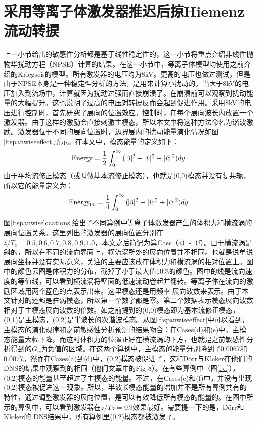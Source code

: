 \section{采用等离子体激发器推迟后掠Hiemenz流动转捩}
上一小节给出的敏感性分析都是基于线性稳定性的，这一小节将重点介绍非线性抛物华扰动方程（NPSE）计算的结果。在这一小节中，等离子体模型均使用之前介绍的Kriegseis的模型\cite{kriegseis2013velocity}。所有激发器的电压均为8kV。更高的电压也做过测试，但是由于NPSE本身是一种稳定性分析的方法，是用来计算小扰动的。当大于8kV的电压加入到流场中，计算就因为扰动过强而直接崩溃了。在崩溃前可以观察到扰动能量的大幅提升。这也说明了过高的电压对转捩反而会起到促进作用。采用8kV的电压进行控制时，首先研究了展向的位置效应。控制时，在每个展向波长内放置一个激发器。由于这样的激励会直接刺激主模态，所以本文中将这种方法命名为谐波激励。激发器位于不同的展向位置时，边界层内的扰动能量演化情况如图\ref{f:spanwiseeffect}所示。在本文中，模态能量的定义如下：
\begin{equation}
{\rm Energy}=\frac{1}{2}\int_{0}^{\infty}{(|\hat u|^2+|\hat v|^2+|\hat w|^2)dy}
\end{equation}
由于平均流修正模态（或叫做基本流修正模态），也就是(0,0)模态并没有复共轭，所以它的能量定义为：
\begin{equation}
{\rm Energy}_{00}=\frac{1}{4}\int_{0}^{\infty}{(|\hat u|^2+|\hat v|^2+|\hat w|^2)dy}
\end{equation}

图\ref{f:spanwiselocations}给出了不同算例中等离子体激发器产生的体积力和横流涡的展向位置关系。这里列出的激发器的展向位置分别在$z/T_z = 0.5, 0.6, 0.7, 0.8, 0.9, 1.0$，本文之后简记为算Case（a）-（f）。由于横流涡是斜的，所以在不同的流向界面上，横流涡所处的展向位置并不相同。也就是说单说展向坐标并没有实际意义，关注的主要应该放在体积力和横流涡的相对位置上。图中的颜色云图是体积力的分布，截掉了小于最大值10\%的颜色。图中的线是流向速度的等值线，可以看到横流涡将壁面的低速流动卷起并翻转。等离子体在流向的激励区域用两个蓝色的点表示出来。这里模态还是用频率-展向波数来表示。由于本文针对的还都是驻涡模态，所以第一个数字都是零。第二个数据表示模态展向波数相对于主模态展向波数的倍数。如之前提到的(0,0)模态即为基本流修正模态，(0,1)是主模态，(0,2)是半波长的次谐波模态。从图\ref{f:spanwiseeffect}中可以看到，主模态的演化规律和之前敏感性分析预测的结果吻合：在Cases(d)和(e)中，主模态能量大幅下降，而这时体积力的位置正好在横流涡的下方，也就是之前敏感性分析得到的$G_w$为负值的区域。在这两个算例中，主模态的能量分别降到了0.0067和0.0077。然而在Cases(a)到(d)中，(0,2)模态被促进了，这和D\"orr与Kloker\cite{dorr2016}在他们的DNS的结果中观察到的相同（他们文章中的Fig 8）。在有些算例中（图\ref{f:d}），(0,2)模态的能量甚至超过了主模态的能量。不过，在Cases(e)和(f)中，并没有出现(0,2)模态被促进这一现象。所以，半波长模态能量的增加并不是所有算例共有的特性，通过调整激发器的展向位置，是可以有效降低所有模态的能量的。在图中所示的算例中，可以看到激发器在$z/Tz=0.9$效果最好。需要提一下的是，D\"orr和Kloker的 DNS\cite{dorr2016}结果中，所有算例里(0,2)模态都被激发了。

